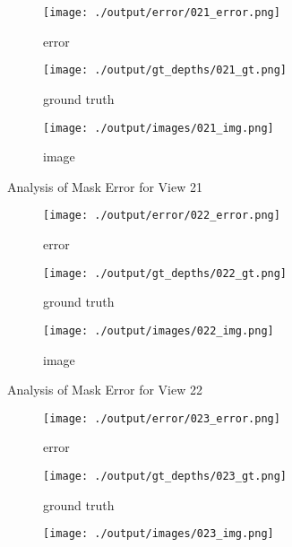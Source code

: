 \documentclass{article}
\begin{document}
\begin{figure}
\begin{subfigure}{0.3\textwidth}
		\centering
		\texttt{[image: ./output/error/021\_error.png]}
		\caption{error}
		\label{fig:error21}
	\end{subfigure}
	\hfill
	\centering
	\begin{subfigure}{0.3\textwidth}
		\centering
		\texttt{[image: ./output/gt\_depths/021\_gt.png]}
		\caption{ground truth}
		\label{fig:gt21}
	\end{subfigure}
	\hfill
	\centering
	\begin{subfigure}{0.3\textwidth}
		\centering
		\texttt{[image: ./output/images/021\_img.png]}
		\caption{image}
		\label{fig:img21}
	\end{subfigure}
	\hfill
	\caption{Analysis of Mask Error for View 21}
	\label{fig:error_analys21}
\end{figure}\begin{figure}
	\centering
	\begin{subfigure}{0.3\textwidth}
		\centering
		\texttt{[image: ./output/error/022\_error.png]}
		\caption{error}
		\label{fig:error22}
	\end{subfigure}
	\hfill
	\centering
	\begin{subfigure}{0.3\textwidth}
		\centering
		\texttt{[image: ./output/gt\_depths/022\_gt.png]}
		\caption{ground truth}
		\label{fig:gt22}
	\end{subfigure}
	\hfill
	\centering
	\begin{subfigure}{0.3\textwidth}
		\centering
		\texttt{[image: ./output/images/022\_img.png]}
		\caption{image}
		\label{fig:img22}
	\end{subfigure}
	\hfill
	\caption{Analysis of Mask Error for View 22}
	\label{fig:error_analys22}
\end{figure}\begin{figure}
	\centering
	\begin{subfigure}{0.3\textwidth}
		\centering
		\texttt{[image: ./output/error/023\_error.png]}
		\caption{error}
		\label{fig:error23}
	\end{subfigure}
	\hfill
	\centering
	\begin{subfigure}{0.3\textwidth}
		\centering
		\texttt{[image: ./output/gt\_depths/023\_gt.png]}
		\caption{ground truth}
		\label{fig:gt23}
	\end{subfigure}
	\hfill
	\centering
	\begin{subfigure}{0.3\textwidth}
		\centering
		\texttt{[image: ./output/images/023\_img.png]}

\end{subfigure}
\end{figure}
\end{document}
